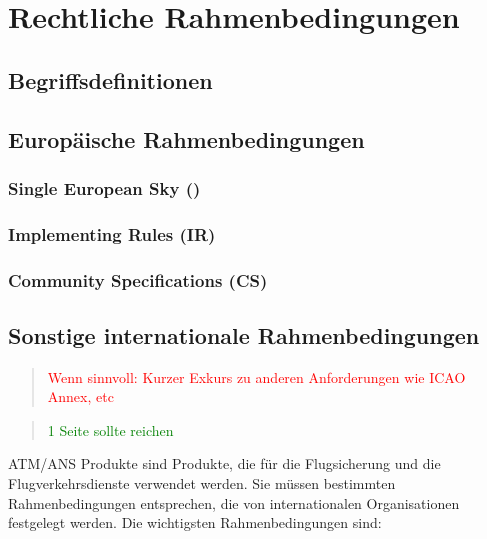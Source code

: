 \chapter{Rechtliche Rahmenbedingungen}

    \section{Begriffsdefinitionen}
        
        \pagebreak

        
    \section{Europäische Rahmenbedingungen}
        \subsection{Single European Sky ()}
            
            \pagebreak
            
        \subsection{Implementing Rules (IR)}
            
            \pagebreak
        
        \subsection{Community Specifications (CS)}
            
                \pagebreak

    \section{Sonstige internationale Rahmenbedingungen}

    \begin{quote}
\textcolor{red}{Wenn sinnvoll: Kurzer Exkurs zu anderen Anforderungen wie ICAO Annex, etc}
\end{quote}
\begin{quote}
\textcolor{green}{1 Seite sollte reichen}
\end{quote}

ATM/ANS Produkte sind Produkte, die für die Flugsicherung und die Flugverkehrsdienste verwendet werden. Sie müssen bestimmten Rahmenbedingungen entsprechen, die von internationalen Organisationen festgelegt werden. Die wichtigsten Rahmenbedingungen sind:

